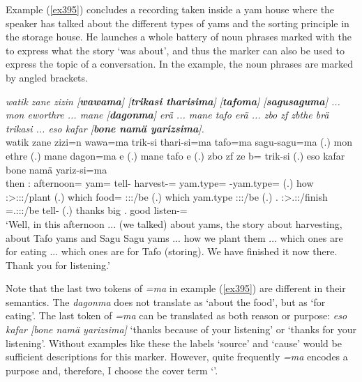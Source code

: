 Example (\ref{ex395}) concludes a recording taken inside a yam house where the speaker has talked about the different types of yams and the sorting principle in the storage house. He launches a whole battery of noun phrases marked with the   to express what the story `was about', and thus the  marker can also be used to express the topic of a conversation. In the example, the noun phrases are marked by angled brackets.

\begin{exe}
	\ex \emph{watik zane zizin [\textbf{wawama}] [\textbf{trikasi tharisima}] [\textbf{tafoma}] [\textbf{sagusaguma}] ... mon eworthre ... mane [\textbf{dagonma}] erä ... mane tafo erä ... zbo zf zbthe brä trikasi ... eso kafar [\textbf{bone namä yarizsima}].}\\
	\gll watik zane zizi=n wawa=ma trik-si thari-si=ma tafo=ma sagu-sagu=ma (.) mon ethre (.) mane dagon=ma e (.) mane tafo e (.) zbo zf ze b= trik-si (.) eso kafar bone namä yariz-si=ma\\
	then \Dem:\Prox{} afternoon=\Loc{} yam=\Char{} tell-\Nmlz{} harvest-\Nmlz=\Char{} yam.type=\Char{} \Redup-yam.type=\Char{} (.) how \Fpl:\Sbj>\Stpl:\Obj:\Nonpast:\Ipfv/plant (.) which food=\Char{} \Stpl:\Sbj:\Nonpast:\Ipfv/be (.) which yam.type \Stpl:\Sbj:\Nonpast:\Ipfv/be (.) \Prox.\All{} \Imm{} \Fdu:\Sbj>\Tsg.\F:\Rpst:\Pfv/finish \Med=\Tsg.\F:\Sbj:\Nonpast:\Ipfv/be tell-\Nmlz{} (.) thanks big \Ssg.\Poss{} good listen-\Nmlz=\Char{}\\
	\trans `Well, in this afternoon ... (we talked) about yams, the story about harvesting, about Tafo yams and Sagu Sagu yams ... how we plant them ... which ones are for eating ... which ones are for Tafo (storing). We have finished it now there. Thank you for listening.'
	\label{ex395}
\end{exe}

Note that the last two tokens of \emph{=ma} in example (\ref{ex395}) are different in their semantics. The  \emph{dagonma} does not translate as `about the food', but as `for eating'. The last token of \emph{=ma} can be translated as both reason or purpose: \emph{eso kafar [bone namä yarizsima]} `thanks because of your listening' or `thanks for your listening'. Without examples like these the labels `source' and `cause' would be sufficient descriptions for this  marker. However, quite frequently \emph{=ma} encodes a purpose and, therefore, I choose the cover term `'.%


